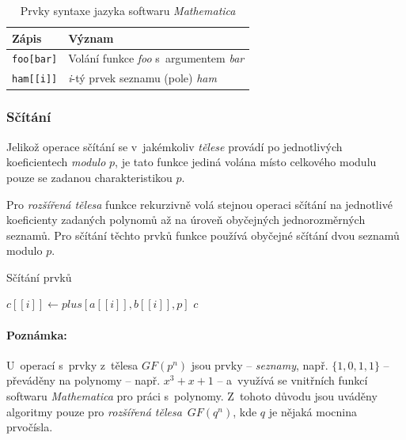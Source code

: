\documentclass[thesis=M,czech,hidelinks]{FITthesis}[2012/06/26]
\newcommand{\0}{{\textcolor[gray]{0.75}{0}}}
\newenvironment{algoritmus}{
    \floatname{algorithm}{Algoritmus}
    \begin{algorithm}
}{\end{algorithm}}
\begin{document}
\begin{table}[!ht]
    \centering
    \begin{tabular}{l  l}
        Zápis               & Význam                                            \\
        \hline
        \texttt{foo[bar]}   & Volání funkce \emph{foo} s~argumentem \emph{bar}  \\
        \texttt{ham[[i]]}   & \emph{i}-tý prvek seznamu (pole) \emph{ham}       \\
    \end{tabular}
    \caption{Prvky syntaxe jazyka softwaru \emph{Mathematica}}
\end{table}


\subsubsection{Sčítání}

Jelikož operace sčítání se v~jakémkoliv \emph{tělese} provádí po jednotlivých
koeficientech \emph{modulo} $p$, je tato funkce jediná volána místo celkového
modulu pouze se zadanou charakteristikou $p$.

Pro \emph{rozšířená tělesa} funkce rekurzivně volá stejnou operaci sčítání na
jednotlivé koeficienty zadaných polynomů až na úroveň obyčejných jednorozměrných
seznamů. Pro sčítání těchto prvků funkce používá obyčejné sčítání dvou seznamů
modulo $p$.

\begin{algoritmus}[!ht]
    \caption{Sčítání prvků}
    \begin{algorithmic}[1]
            \State $c[[i]] \gets plus[a[[i]],b[[i]],p]$
        \EndFor
        \State \Return $c$
     \EndFunction
    \end{algorithmic}
\end{algoritmus}

\vfil


\paragraph{Poznámka:} U~operací s~prvky z~tělesa $GF(p^n)$ jsou prvky --
\emph{seznamy}, např. $\{1,0,1,1\}$ -- převáděny na polynomy -- např. $x^3+x+1$
-- a~využívá se vnitřních funkcí softwaru \emph{Mathematica} pro práci
s~polynomy. Z~tohoto důvodu jsou uváděny algoritmy pouze pro \emph{rozšířená
tělesa}~$GF(q^n)$, kde $q$ je nějaká mocnina prvočísla.
\end{document}
